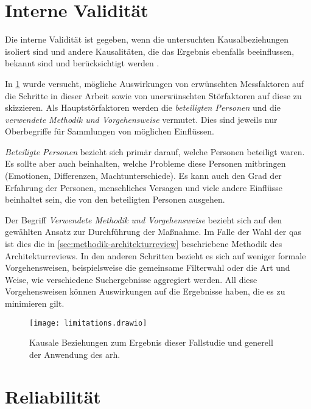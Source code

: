 \section{Interne Validität}

Die interne Validität ist gegeben, wenn die untersuchten Kausalbeziehungen isoliert sind und andere Kausalitäten, die das Ergebnis ebenfalls beeinflussen, bekannt sind und berücksichtigt werden \cite{Runeson2009}.

In \cref{fig:limitations} wurde versucht, mögliche Auswirkungen von erwünschten Messfaktoren auf die Schritte in dieser Arbeit sowie von unerwünschten Störfaktoren auf diese zu skizzieren.
Als Hauptstörfaktoren werden die \emph{beteiligten Personen} und die \emph{verwendete Methodik und Vorgehensweise} vermutet. 
Dies sind jeweils nur Oberbegriffe für Sammlungen von möglichen Einflüssen.

\emph{Beteiligte Personen} bezieht sich primär darauf, welche Personen beteiligt waren.
Es sollte aber auch beinhalten, welche Probleme diese Personen mitbringen (Emotionen, Differenzen, Machtunterschiede).
Es kann auch den Grad der Erfahrung der Personen, menschliches Versagen und viele andere Einflüsse beinhaltet sein, die von den beteiligten Personen ausgehen.

Der Begriff \emph{Verwendete Methodik und Vorgehensweise} bezieht sich auf den gewählten Ansatz zur Durchführung der Maßnahme.
Im Falle der Wahl der \glspl{qa} ist dies die in \cref{sec:methodik-architekturreview} beschriebene Methodik des Architekturreviews.
In den anderen Schritten bezieht es sich auf weniger formale Vorgehensweisen, beispielsweise die gemeinsame Filterwahl oder die Art und Weise, wie verschiedene Suchergebnisse aggregiert werden.
All diese Vorgehensweisen können Auswirkungen auf die Ergebnisse haben, die es zu minimieren gilt. 

\begin{figure}
	\centering
	\texttt{[image: limitations.drawio]}
	\caption[Kausale Beziehungen Fallstudie]{
			Kausale Beziehungen zum Ergebnis dieser Fallstudie und generell der Anwendung des \gls{arh}.
		}
	\label{fig:limitations}
\end{figure}

\section{Reliabilität}

